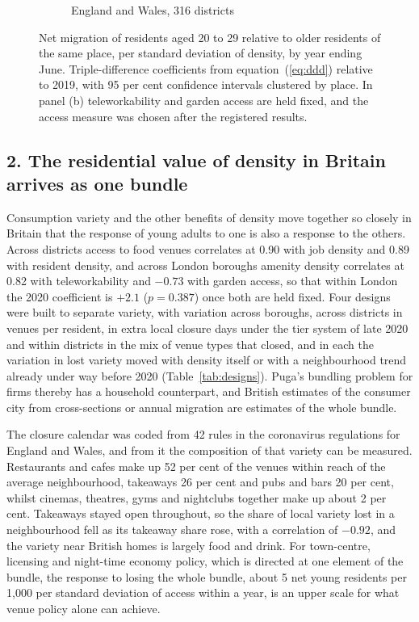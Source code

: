 \documentclass[11pt,a4paper]{article}
\begin{document}
\begin{figure}[htbp]
\begin{subfigure}[t]{0.49\linewidth}
\caption{England and Wales, 316 districts}
\end{subfigure}
\caption{Net migration of residents aged 20 to 29 relative to older residents of the same place, per standard deviation of density, by year ending June. Triple-difference coefficients from equation~(\ref{eq:ddd}) relative to 2019, with 95 per cent confidence intervals clustered by place. In panel (b) teleworkability and garden access are held fixed, and the access measure was chosen after the registered results.}\label{fig:main}
\end{figure}

\subsection*{2. The residential value of density in Britain arrives as one bundle}

Consumption variety and the other benefits of density move together so closely in Britain that the response of young adults to one is also a response to the others. Across districts access to food venues correlates at 0.90 with job density and 0.89 with resident density, and across London boroughs amenity density correlates at 0.82 with teleworkability and $-0.73$ with garden access, so that within London the 2020 coefficient is $+2.1$ ($p = 0.387$) once both are held fixed. Four designs were built to separate variety, with variation across boroughs, across districts in venues per resident, in extra local closure days under the tier system of late 2020 and within districts in the mix of venue types that closed, and in each the variation in lost variety moved with density itself or with a neighbourhood trend already under way before 2020 (Table~\ref{tab:designs}). Puga's bundling problem for firms thereby has a household counterpart, and British estimates of the consumer city from cross-sections or annual migration are estimates of the whole bundle.

The closure calendar was coded from 42 rules in the coronavirus regulations for England and Wales, and from it the composition of that variety can be measured. Restaurants and cafes make up 52 per cent of the venues within reach of the average neighbourhood, takeaways 26 per cent and pubs and bars 20 per cent, whilst cinemas, theatres, gyms and nightclubs together make up about 2 per cent. Takeaways stayed open throughout, so the share of local variety lost in a neighbourhood fell as its takeaway share rose, with a correlation of $-0.92$, and the variety near British homes is largely food and drink. For town-centre, licensing and night-time economy policy, which is directed at one element of the bundle, the response to losing the whole bundle, about 5 net young residents per 1,000 per standard deviation of access within a year, is an upper scale for what venue policy alone can achieve.
\end{document}
